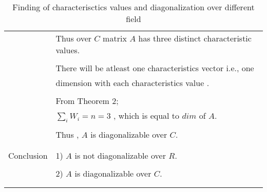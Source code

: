 \documentclass[journal,12pt]{IEEEtran}
\begin{document}
\begin{longtable}{|l|l|}
& Thus over $C$ matrix $A$ has three distinct characteristic values.\\
&\\
&There will be atleast one characteristics vector i.e., one\\ & dimension with each characteristics value .\\
&\\
& From Theorem 2;\\
& $\sum_{i} W_i = n = 3$ , which is equal to $dim$ of $A$.\\
&\\
& Thus , $A$ is diagonalizable over $C$.\\
&\\
\hline
\multirow{3}{*}{Conclusion} & \\
& 1) $A$ is not diagonalizable over $R$. \\
&\\
& 2) $A$ is diagonalizable over $C$.\\
&\\
\hline
\caption{Finding of characterisctics values and diagonalization over different field}
\label{table:2}
\end{longtable}
\end{document}
